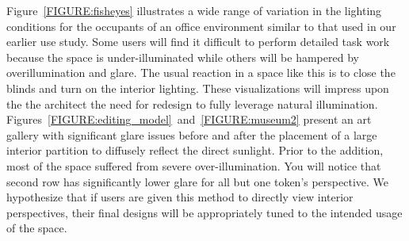 \documentclass[10pt,twocolumn,letterpaper]{article}
\begin{document}



Figure~\ref{FIGURE:fisheyes} illustrates a wide range of variation in
the lighting conditions for the occupants of an office environment similar to that used in our earlier use study.
Some users will find it difficult to perform detailed task work because the space is under-illuminated while others will be hampered by overillumination and glare.
The usual reaction in a space like this is to close the blinds and
turn on the interior lighting.  These visualizations will impress upon the 
the architect the need for 
redesign to fully leverage natural illumination.
Figures~\ref{FIGURE:editing_model}~and~\ref{FIGURE:museum2}
present an art gallery with significant
glare issues before and after the placement of a large interior
partition to diffusely reflect the direct sunlight.  Prior to the
addition, most of the space suffered from severe over-illumination.
You will notice that second row has significantly lower glare for all
but one token's perspective.  
We hypothesize that if users are given this method to directly view
interior perspectives, their final designs will be appropriately tuned
to the intended usage of the space.
\end{document}
